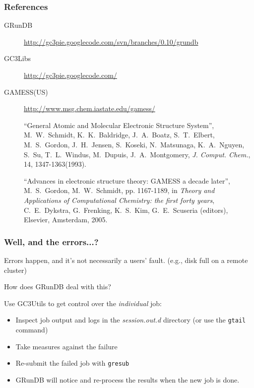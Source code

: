 \documentclass {beamer}
\newcommand{\largeskip}{\vspace{1em}}
\def\+{\largeskip}
\begin{document}
\begin{frame}
  \frametitle{References}
  \begin{small}
    \begin{description}
    \item[GRunDB]
      \url{http://gc3pie.googlecode.com/svn/branches/0.10/grundb}
    \item[GC3Libs] \url{http://gc3pie.googlecode.com/}
    \item[GAMESS(US)] \url{http://www.msg.chem.iastate.edu/gamess/}

      \begin{footnotesize}
        \+ ``General Atomic and Molecular Electronic Structure
        System'', M.~W.~Schmidt, K.~K.~Baldridge, J.~A.~Boatz,
        S.~T.~Elbert, M.~S.~Gordon, J.~H.~Jensen, S.~Koseki,
        N.~Matsunaga, K.~A.~Nguyen, S.~Su, T.~L.~Windus, M.~Dupuis,
        J.~A.~Montgomery, \emph{J. Comput. Chem.}, 14,
        1347-1363(1993).

        \+ ``Advances in electronic structure theory: GAMESS a decade
        later'', M.~S.~Gordon, M.~W.~Schmidt, pp. 1167-1189, in {\em
          Theory and Applications of Computational Chemistry: the
          first forty years}, C.~E.~Dykstra, G.~Frenking, K.~S.~Kim,
        G.~E.~Scuseria (editors), Elsevier, Amsterdam, 2005.
      \end{footnotesize}
    \end{description}
  \end{small}
\end{frame}

\begin{frame}
  \frametitle{Well, and the errors...?}

  Errors happen, and it's not necessarily a users' fault.  (e.g., disk
  full on a remote cluster)

  \+ How does GRunDB deal with this?

  \pause
  \+ Use GC3Utils to get control over the \emph{individual} job:
  \begin{itemize}
  \item Inspect job output and logs in the \emph{session.out.d}
    directory (or use the \texttt{gtail} command)
  \item Take measures against the failure
  \item Re-submit the failed job with \texttt{gresub}
  \item GRunDB will notice and re-process the results when the new job
    is done.    
  \end{itemize}

\end{frame}
\end{document}
